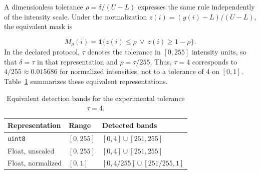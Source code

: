 \documentclass[pdflatex,iicol,sn-mathphys-num]{sn-jnl}
\newif\ifshowportuguese
\newcommand{\pt}[1]{\ifshowportuguese\par\begingroup\small\color{blue!55!black}\noindent\textbf{PT: }#1\par\endgroup\fi}
\begin{document}
A dimensionless tolerance $\rho=\delta/(U-L)$ expresses the same rule independently of the intensity scale. Under the normalization $z(i)=(y(i)-L)/(U-L)$, the equivalent mask is
\pt{Uma tolerância adimensional $\rho=\delta/(U-L)$ expressa a mesma regra independentemente da escala de intensidade. Sob a normalização $z(i)=(y(i)-L)/(U-L)$, a máscara equivalente é}
\begin{equation}
M_\rho(i)=\mathbf{1}\{z(i)\leq\rho\ \lor\ z(i)\geq1-\rho\}.
\label{eq:normalized_impulse_mask}
\end{equation}
In the declared protocol, $\tau$ denotes the tolerance in $[0,255]$ intensity units, so that $\delta=\tau$ in that representation and $\rho=\tau/255$. Thus, $\tau=4$ corresponds to $4/255\approx0.015686$ for normalized intensities, not to a tolerance of 4 on $[0,1]$. Table~\ref{tab:range_tolerance} summarizes these equivalent representations.
\pt{No protocolo declarado, $\tau$ denota a tolerância em unidades de intensidade de $[0,255]$, de modo que $\delta=\tau$ nessa representação e $\rho=\tau/255$. Assim, $\tau=4$ corresponde a $4/255\approx0.015686$ para intensidades normalizadas, e não a uma tolerância de 4 em $[0,1]$. A Tabela~\ref{tab:range_tolerance} resume essas representações equivalentes.}

\begin{table}[t]
  \centering
  \caption{Equivalent detection bands for the experimental tolerance $\tau=4$.}
  \label{tab:range_tolerance}
  \small
  \setlength{\tabcolsep}{3pt}
  \begin{tabular}{lll}
  \toprule
  Representation & Range & Detected bands \\
  \midrule
  \texttt{uint8} & $[0,255]$ & $[0,4]\cup[251,255]$ \\
  Float, unscaled & $[0,255]$ & $[0,4]\cup[251,255]$ \\
  Float, normalized & $[0,1]$ & $[0,4/255]\cup[251/255,1]$ \\
  \bottomrule
  \end{tabular}
  \pt{Faixas de detecção equivalentes para a tolerância experimental $\tau=4$. Um array de ponto flutuante sem reescala utiliza as mesmas faixas do array \texttt{uint8}; um array normalizado exige a conversão dos limiares.}
\end{table}
\end{document}
